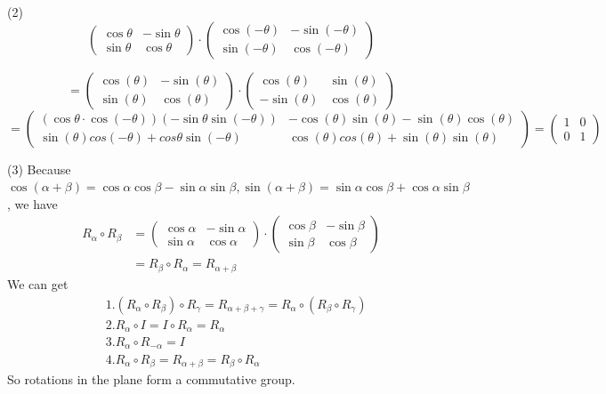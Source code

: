 \documentclass[12pt]{article}
\begin{document}
\medskip
(2)
\[
\begin{pmatrix}
\cos\theta & -\sin\theta \\
\sin\theta & \cos\theta
\end{pmatrix}
\cdot
\begin{pmatrix}
\cos(-\theta) & -\sin(-\theta) \\
\sin(-\theta) & \cos(-\theta)
\end{pmatrix}
\]

\[
=
\begin{pmatrix}
\cos(\theta) & -\sin(\theta) \\
\sin(\theta) & \cos(\theta)
\end{pmatrix}
\cdot
\begin{pmatrix}
\cos(\theta) & \sin(\theta) \\
-\sin(\theta) & \cos(\theta)
\end{pmatrix}
\]
\[
=
\begin{pmatrix}
(\cos\theta \cdot \cos(-\theta))  (-\sin \theta \sin(-\theta)) & -\cos(\theta)\sin(\theta) - \sin(\theta)\cos(\theta) \\
\sin(\theta)cos(-\theta)+cos\theta \sin(-\theta) & 
\cos(\theta)cos(\theta)+\sin(\theta) \sin(\theta)
\end{pmatrix}
=
\begin{pmatrix}
1 & 0 \\
0 & 1
\end{pmatrix}
\]

\medskip
(3) Because $
\cos(\alpha + \beta) = \cos \alpha \cos \beta  - \sin \alpha \sin \beta,
\sin(\alpha + \beta) = \sin \alpha \cos \beta + \cos \alpha \sin \beta
$, we have 
\begin{align*}
R_{\alpha} \circ R_{\beta} &= 
\begin{pmatrix}
\cos\alpha & -\sin\alpha \\
\sin\alpha & \cos\alpha
\end{pmatrix} 
\cdot
\begin{pmatrix}
\cos\beta & -\sin\beta \\
\sin\beta & \cos\beta
\end{pmatrix} \\
&= R_{\beta} \circ R_{\alpha} 
= R_{\alpha + \beta}
\end{align*}
We can get 
\begin{align*}
&1. (R_{\alpha} \circ R_{\beta}) \circ R_{\gamma} = R_{\alpha + \beta + \gamma} = R_{\alpha} \circ (R_{\beta} \circ R_{\gamma}) \\
&2. R_{\alpha} \circ I = I \circ R_{\alpha} = R_{\alpha} \\
&3. R_{\alpha} \circ R_{-\alpha} = I \\
&4. R_{\alpha} \circ R_{\beta} = R_{\alpha + \beta} = R_{\beta} \circ R_{\alpha}
\end{align*}
So rotations in the plane form a commutative group.
\end{document}
